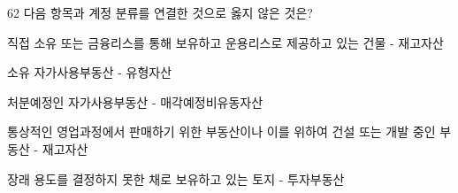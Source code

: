 \begin{question}{62}
다음 항목과 계정 분류를 연결한 것으로 옳지 않은 것은?
\begin{choices}
  \item 직접 소유 또는 금융리스를 통해 보유하고 운용리스로 제공하고 있는 건물 - 재고자산
  \item 소유 자가사용부동산 - 유형자산
  \item 처분예정인 자가사용부동산 - 매각예정비유동자산
  \item 통상적인 영업과정에서 판매하기 위한 부동산이나 이를 위하여 건설 또는 개발 중인 부동산 - 재고자산
  \item 장래 용도를 결정하지 못한 채로 보유하고 있는 토지 - 투자부동산
\end{choices}
\end{question}
